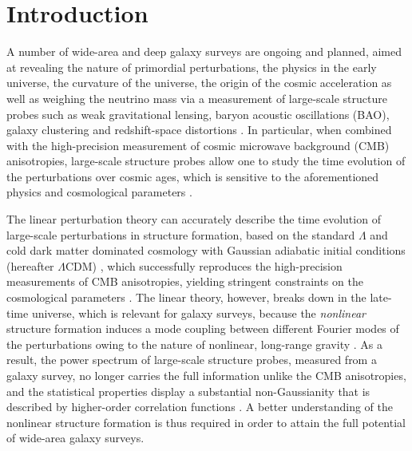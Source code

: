\documentclass[prd,onecolumn,notitlepage,amsmath,amssymb,floatfix,superscriptaddress]{revtex4-1}
\begin{document}
{\let\newpage\relax\maketitle}




\section{Introduction}
A number of wide-area and deep galaxy surveys are ongoing and planned, aimed at revealing the nature of primordial perturbations, 
the physics in the early universe, 
the curvature of the universe, the origin of the cosmic acceleration as well as weighing the neutrino mass via a measurement of large-scale structure probes such as weak gravitational lensing, 
baryon acoustic oscillations (BAO), 
galaxy clustering and redshift-space distortions \citep[e.g.,][]{Takadaetal:06,Takadaetal:14,TakadaDore:15}.
In particular, when combined with the high-precision measurement of cosmic microwave background (CMB) anisotropies,  large-scale structure probes allow one to study the time evolution of the perturbations over cosmic ages, which is sensitive to the aforementioned physics and cosmological parameters \citep[e.g.][]{Alametal:17}. 

The linear perturbation theory can accurately describe the time evolution of large-scale perturbations in structure formation, based on the standard
$\Lambda$ and cold dark matter dominated cosmology with Gaussian adiabatic initial conditions (hereafter $\Lambda$CDM) \cite{DodelsonBook}, which successfully reproduces 
the high-precision measurements of CMB anisotropies, yielding stringent constraints on the cosmological parameters \citep{PlanckCosmology:16}.
The linear theory, however, breaks down in the late-time universe, which is relevant for galaxy surveys, because the {\em nonlinear} structure formation 
induces a mode coupling between different Fourier modes of the perturbations owing to the nature of nonlinear, long-range gravity \citep[][for a thorough review]{Bernardeauetal:02,Desjacquesetal:16}. As a result, the power spectrum of large-scale structure probes, measured from a galaxy survey, no longer carries the full information unlike the CMB anisotropies, and the statistical properties display a substantial non-Gaussianity that is described by higher-order correlation functions \citep{TakadaJain:03a}. A better understanding of the nonlinear structure formation is thus 
required
in order to attain the full potential of wide-area galaxy surveys. 
\end{document}
